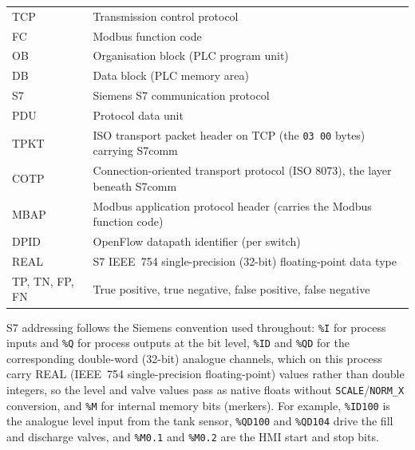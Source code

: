\begin{center}
\begin{tabular}{ll}
TCP & Transmission control protocol \\
FC & Modbus function code \\
OB & Organisation block (PLC program unit) \\
DB & Data block (PLC memory area) \\
S7 & Siemens S7 communication protocol \\
PDU & Protocol data unit \\
TPKT & ISO transport packet header on TCP (the \texttt{03 00} bytes) carrying S7comm \\
COTP & Connection-oriented transport protocol (ISO 8073), the layer beneath S7comm \\
MBAP & Modbus application protocol header (carries the Modbus function code) \\
DPID & OpenFlow datapath identifier (per switch) \\
REAL & S7 IEEE~754 single-precision (32-bit) floating-point data type \\
TP, TN, FP, FN & True positive, true negative, false positive, false negative \\
\hline
\end{tabular}
\end{center}

\vspace{0.5em}
\noindent
S7 addressing follows the Siemens convention used throughout: \texttt{\%I} for process inputs and \texttt{\%Q} for process outputs at the bit level, \texttt{\%ID} and \texttt{\%QD} for the corresponding double-word (32-bit) analogue channels, which on this process carry REAL (IEEE~754 single-precision floating-point) values rather than double integers, so the level and valve values pass as native floats without \texttt{SCALE}/\texttt{NORM\_X} conversion, and \texttt{\%M} for internal memory bits (merkers). For example, \texttt{\%ID100} is the analogue level input from the tank sensor, \texttt{\%QD100} and \texttt{\%QD104} drive the fill and discharge valves, and \texttt{\%M0.1} and \texttt{\%M0.2} are the HMI start and stop bits.
